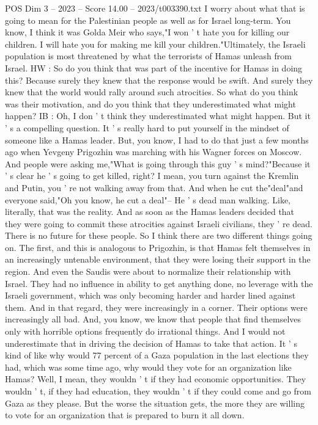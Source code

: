 \begin{textsample}{POS Dim 3 – 2023 – Score 14.00 – 2023/t003390.txt}
I worry about what that is going to mean for the Palestinian people as well as for Israel long-term.
You know, I think it was Golda Meir who says,"I won ' t hate you for killing our children.
I will hate you for making me kill your children."Ultimately, the Israeli population is most threatened by what the terrorists of Hamas unleash from Israel.
HW : So do you think that was part of the incentive for Hamas in doing this?
Because surely they knew that the response would be swift.
And surely they knew that the world would rally around such atrocities.
So what do you think was their motivation, and do you think that they underestimated what might happen?
IB : Oh, I don ' t think they underestimated what might happen.
But it ' s a compelling question.
It ' s really hard to put yourself in the mindset of someone like a Hamas leader.
But, you know, I had to do that just a few months ago when Yevgeny Prigozhin was marching with his Wagner forces on Moscow.
And people were asking me,"What is going through this guy ' s mind?"Because it ' s clear he ' s going to get killed, right?
I mean, you turn against the Kremlin and Putin, you ' re not walking away from that.
And when he cut the"deal"and everyone said,"Oh you know, he cut a deal"-- He ' s dead man walking.
Like, literally, that was the reality.
And as soon as the Hamas leaders decided that they were going to commit these atrocities against Israeli civilians, they ' re dead.
There is no future for these people.
So I think there are two different things going on.
The first, and this is analogous to Prigozhin, is that Hamas felt themselves in an increasingly untenable environment, that they were losing their support in the region.
And even the Saudis were about to normalize their relationship with Israel.
They had no influence in ability to get anything done, no leverage with the Israeli government, which was only becoming harder and harder lined against them.
And in that regard, they were increasingly in a corner.
Their options were increasingly all bad.
And, you know, we know that people that find themselves only with horrible options frequently do irrational things.
And I would not underestimate that in driving the decision of Hamas to take that action.
It ' s kind of like why would 77 percent of a Gaza population in the last elections they had, which was some time ago, why would they vote for an organization like Hamas?
Well, I mean, they wouldn ' t if they had economic opportunities.
They wouldn ' t, if they had education, they wouldn ' t if they could come and go from Gaza as they please.
But the worse the situation gets, the more they are willing to vote for an organization that is prepared to burn it all down.

\end{textsample}

